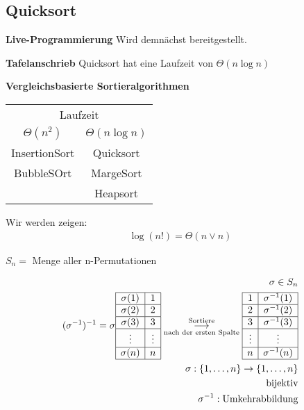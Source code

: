 \subsection{Quicksort}
\textbf{Live-Programmierung}
Wird demnächst bereitgestellt.

\textbf{Tafelanschrieb}
Quicksort hat eine Laufzeit von $\Theta(n \log n)$
\begin{center}
\textbf{Vergleichsbasierte Sortieralgorithmen}\\
\begin{tabular}{c|c}
    \multicolumn{2}{c}{Laufzeit}\\
    $\Theta(n^2)$ & $\Theta(n \log n)$\\
    InsertionSort & Quicksort\\\hline
    BubbleSOrt & MargeSort\\
     & Heapsort
\end{tabular}
\end{center}
Wir werden zeigen:
\begin{align*}
    \log(n!) = \Theta(n \lor n)
\end{align*}


$S_n = $ Menge aller n-Permutationen

\begin{align*}
\sigma \in S_n\\
(\sigma^{-1})^{-1} = \sigma
\begin{array}{|c|c|}\hline
    \sigma(1) & 1\\\hline
    \sigma(2) & 2\\\hline
    \sigma(3) & 3\\\hline
    \vdots & \vdots\\\hline
    \sigma(n) & n\\\hline
\end{array}
\overset{\text{Sortiere}}{\underset{\text{nach der ersten Spalte}}{\longrightarrow}}
\begin{array}{|c|c|}\hline
    1 & \sigma^{-1}(1)\\\hline
    2 & \sigma^{-1}(2)\\\hline
    3 & \sigma^{-1}(3)\\\hline
    \vdots & \vdots\\\hline
    n & \sigma^{-1}(n)\\\hline
\end{array}\\

\sigma: \{1, \dots, n\} \rightarrow \{1, \dots, n\}\\
\text{bijektiv}\\
\sigma^{-1}: \text{Umkehrabbildung}
\end{align*}

